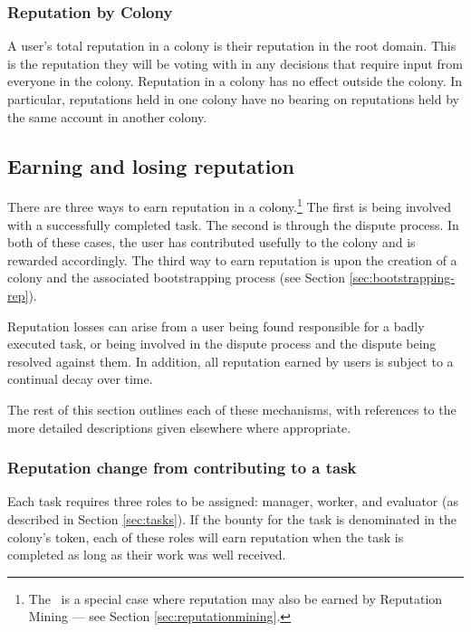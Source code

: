 \subsubsection{Reputation by Colony}\label{sec:rep-by-colony}
A user's total reputation in a colony is their reputation in the root domain. This is the reputation they will be voting with in any decisions that require input from everyone in the colony. Reputation in a colony has no effect outside the colony. In particular, reputations held in one colony have no bearing on reputations held by the same account in another colony.

\subsection{Earning and losing reputation}\label{sec:earning-losing-rep}
There are three ways to earn reputation in a colony.\footnote{The \rc\ is a special case where reputation may also be earned by Reputation Mining --- see Section \ref{sec:reputationmining}.} The first is being involved with a successfully completed task. The second is through the dispute process. In both of these cases, the user has contributed usefully to the colony and is rewarded accordingly. The third way to earn reputation is upon the creation of a colony and the associated bootstrapping process (see Section \ref{sec:bootstrapping-rep}).

Reputation losses can arise from a user being found responsible for a badly executed task, or being involved in the dispute process and the dispute being resolved against them. In addition, all reputation earned by users is subject to a continual decay over time.

The rest of this section outlines each of these mechanisms, with references to the more detailed descriptions given elsewhere where appropriate.

\subsubsection{Reputation change from contributing to a task}\label{sec:earning-rep-from-task}
Each task requires three roles to be assigned: manager, worker, and evaluator (as described in Section \ref{sec:tasks}). If the bounty for the task is denominated in the colony's token, each of these roles will earn reputation when the task is completed as long as their work was well received.

